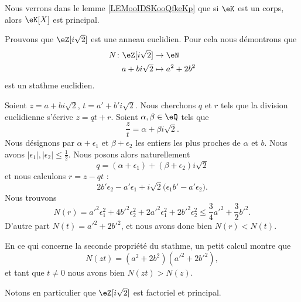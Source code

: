 Nous verrons dans le lemme \ref{LEMooIDSKooQfkeKp} que si $\eK$ est un corps, alors \( \eK[X]\) est principal.

\begin{example} \label{ExeDufyZI}
    Prouvons que \( \eZ[i\sqrt{2}]\) est une anneau euclidien. Pour cela nous démontrons que
    \begin{equation}    \label{EqOZUIooZGmHWl}
        \begin{aligned}
            N\colon \eZ[i\sqrt{2}]&\to \eN \\
            a+bi\sqrt{2}&\mapsto a^2+2b^2 
        \end{aligned}
    \end{equation}
    est un stathme euclidien.    

    Soient \( z=a+bi\sqrt{2}\), \( t=a'+b'i\sqrt{2}\). Nous cherchons \( q\) et \( r\) tels que la division euclidienne s'écrive \( z=qt+r\). Soient \( \alpha,\beta\in \eQ\) tels que 
    \begin{equation}
        \frac{ z }{ t }=\alpha+\beta i\sqrt{2}.
    \end{equation}
    Nous désignons par \( \alpha+\epsilon_1\) et \( \beta+\epsilon_2\) les entiers les plus proches de \( \alpha\) et \( b\). Nous avons \( | \epsilon_1 |,| \epsilon_2 |\leq \frac{ 1 }{2}\). Nous posons alors naturellement 
    \begin{equation}
        q=(\alpha+\epsilon_1)+(\beta+\epsilon_2)i\sqrt{2}
    \end{equation}
    et nous calculons \( r=z-qt\) :
    \begin{equation}
        2b'\epsilon_2-a'\epsilon_1+i\sqrt{2}\big( \epsilon_1b'-a'\epsilon_2 \big).
    \end{equation}
    Nous trouvons 
    \begin{equation}
        N(r)=a'^2\epsilon_1^2+4b'^2\epsilon_2^2+2a'^2\epsilon_1^2+2b'^2\epsilon_2^2\leq \frac{ 3 }{ 4 }a'^2+\frac{ 3 }{2}b'^2.
    \end{equation}
    D'autre part \( N(t)=a'^2+2b'^2\), et nous avons donc bien \( N(r)<N(t)\).

    En ce qui concerne la seconde propriété du stathme, un petit calcul montre que
    \begin{equation}
        N(zt)=(a^2+2b^2)(a'^2+2b'^2),
    \end{equation}
    et tant que \( t\neq 0\) nous avons bien \( N(zt)>N(z)\).
\end{example}

Notons en particulier que \( \eZ[i\sqrt{2}]\) est factoriel et principal.

